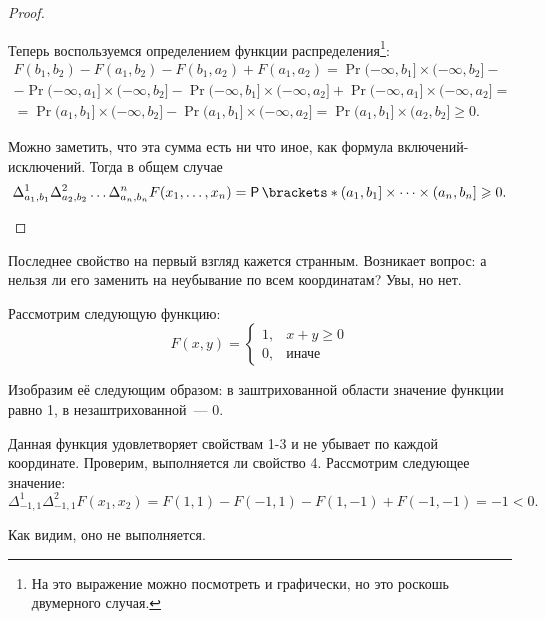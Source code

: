 \begin{proof}
\begin{enumerate}
		Теперь воспользуемся определением функции распределения\footnote{На это выражение можно посмотреть и графически, но это роскошь двумерного случая.}:
		\begin{multline*}
			F(b_1, b_2) - F(a_1, b_2) - F(b_1, a_2) + F(a_1, a_2) = \Pr{(-\infty, b_1] \times (-\infty, b_2]} - \\ - \Pr{(-\infty, a_1] \times (-\infty, b_2]} - \Pr{(-\infty, b_1] \times (-\infty, a_2]} + \Pr{(-\infty, a_1] \times (-\infty, a_2]} = \\
			= \Pr{(a_1, b_1] \times (-\infty, b_2]} - \Pr{(a_1, b_1] \times (-\infty, a_2]} = \Pr{(a_1, b_1] \times (a_2, b_2]} \geq 0.
		\end{multline*}
		
		Можно заметить, что эта сумма есть ни что иное, как формула включений-исключе\-ний. Тогда в общем случае
		\[
		\Delta_{a_1, b_1}^{1} \Delta_{a_2, b_2}^{2} \dots \Delta_{a_n, b_n}^{n} F(x_1, \dots, x_n) = \Pr{(a_1, b_1] \times \dots \times (a_n, b_n]} \geq 0.\qedhere
		\]
	\end{enumerate}
\end{proof}

Последнее свойство на первый взгляд кажется странным. Возникает вопрос: а нельзя ли его заменить на неубывание по всем координатам? Увы, но нет.
\begin{example}
	Рассмотрим следующую функцию:
	\[
	F(x, y) = \begin{cases}
	1,& x + y \geq 0 \\
	0,& \text{иначе}
	\end{cases}
	\]
	
	Изобразим её следующим образом: в заштрихованной области значение функции равно 1, в незаштрихованной~--- 0.
	\begin{center}
	\end{center}

	Данная функция удовлетворяет свойствам 1-3 и не убывает по каждой координате. Проверим, выполняется ли свойство 4. Рассмотрим следующее значение:
	\[
	\Delta_{-1, 1}^{1} \Delta_{-1, 1}^{2} F(x_1, x_2) = F(1, 1) - F(-1, 1) - F(1, -1) + F(-1, -1) = -1 < 0.
	\]
	
	Как видим, оно не выполняется.
\end{example}


